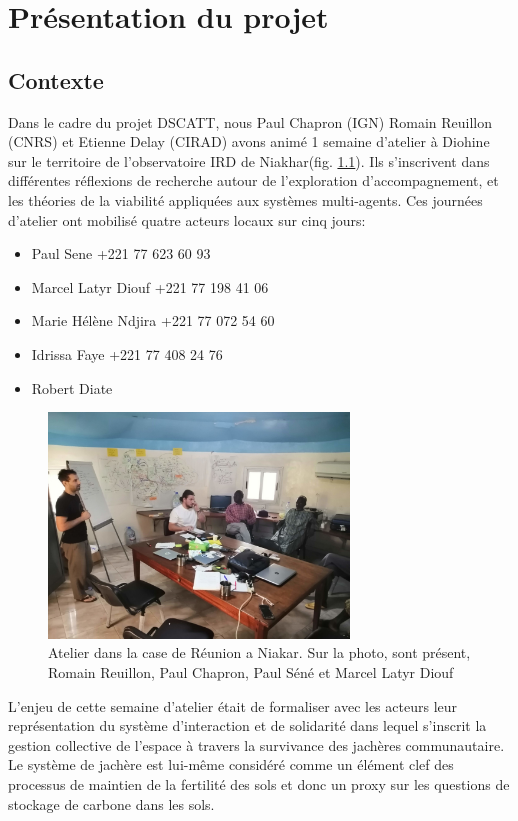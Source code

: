 \chapter{Présentation du projet}


\section{Contexte}

Dans le cadre du projet DSCATT, nous Paul Chapron (IGN) Romain Reuillon (CNRS) et Etienne Delay (CIRAD) avons animé 1 semaine d'atelier à Diohine sur le territoire de l'observatoire IRD de Niakhar(fig. \ref{fig:photoAtelier}). Ils s'inscrivent dans différentes réflexions de recherche autour de l'exploration d'accompagnement, et les théories de la viabilité appliquées aux systèmes multi-agents.
Ces journées d'atelier ont mobilisé quatre acteurs locaux sur cinq jours:
\begin{itemize}
  \item Paul Sene +221 77 623 60 93
  \item Marcel Latyr Diouf +221 77 198 41 06
  \item Marie Hélène Ndjira +221 77 072 54 60
  \item Idrissa Faye +221 77 408 24 76
  \item Robert Diate
\end{itemize}


\begin{figure}
  \begin{center}
    \includegraphics[width=8cm]{img/atelier_niakhar.jpg}
  \end{center}
  \caption{Atelier dans la case de Réunion a Niakar. Sur la photo, sont présent, Romain Reuillon, Paul Chapron, Paul Séné et Marcel Latyr Diouf}
  \label{fig:photoAtelier}
\end{figure}


L'enjeu de cette semaine d'atelier était de formaliser avec les acteurs leur représentation du système d'interaction et de solidarité dans lequel s'inscrit la gestion collective de l'espace à travers la survivance des jachères communautaire. Le système de jachère est lui-même considéré comme un élément clef des processus de maintien de la fertilité des sols et donc un proxy sur les questions de stockage de carbone dans les sols.

